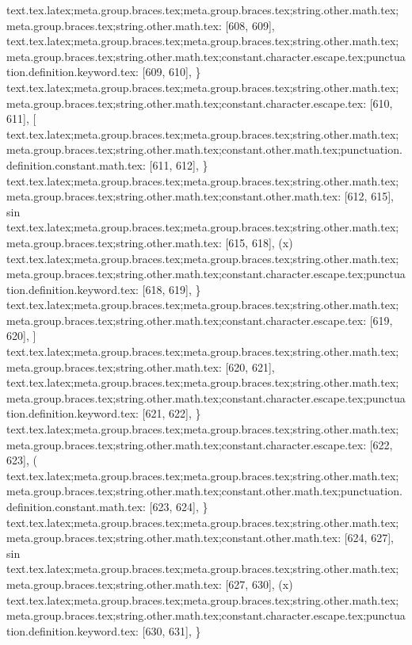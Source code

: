{{{{{{{{{{{{{{{text.tex.latex;meta.group.braces.tex;meta.group.braces.tex;string.other.math.tex;meta.group.braces.tex;string.other.math.tex: [608, 609], {
}
text.tex.latex;meta.group.braces.tex;meta.group.braces.tex;string.other.math.tex;meta.group.braces.tex;string.other.math.tex;constant.character.escape.tex;punctuation.definition.keyword.tex: [609, 610], {\}
text.tex.latex;meta.group.braces.tex;meta.group.braces.tex;string.other.math.tex;meta.group.braces.tex;string.other.math.tex;constant.character.escape.tex: [610, 611], {[}
text.tex.latex;meta.group.braces.tex;meta.group.braces.tex;string.other.math.tex;meta.group.braces.tex;string.other.math.tex;constant.other.math.tex;punctuation.definition.constant.math.tex: [611, 612], {\}
text.tex.latex;meta.group.braces.tex;meta.group.braces.tex;string.other.math.tex;meta.group.braces.tex;string.other.math.tex;constant.other.math.tex: [612, 615], {sin}
text.tex.latex;meta.group.braces.tex;meta.group.braces.tex;string.other.math.tex;meta.group.braces.tex;string.other.math.tex: [615, 618], {(x)}
text.tex.latex;meta.group.braces.tex;meta.group.braces.tex;string.other.math.tex;meta.group.braces.tex;string.other.math.tex;constant.character.escape.tex;punctuation.definition.keyword.tex: [618, 619], {\}
text.tex.latex;meta.group.braces.tex;meta.group.braces.tex;string.other.math.tex;meta.group.braces.tex;string.other.math.tex;constant.character.escape.tex: [619, 620], {]}
text.tex.latex;meta.group.braces.tex;meta.group.braces.tex;string.other.math.tex;meta.group.braces.tex;string.other.math.tex: [620, 621], {
}
text.tex.latex;meta.group.braces.tex;meta.group.braces.tex;string.other.math.tex;meta.group.braces.tex;string.other.math.tex;constant.character.escape.tex;punctuation.definition.keyword.tex: [621, 622], {\}
text.tex.latex;meta.group.braces.tex;meta.group.braces.tex;string.other.math.tex;meta.group.braces.tex;string.other.math.tex;constant.character.escape.tex: [622, 623], {(}
text.tex.latex;meta.group.braces.tex;meta.group.braces.tex;string.other.math.tex;meta.group.braces.tex;string.other.math.tex;constant.other.math.tex;punctuation.definition.constant.math.tex: [623, 624], {\}
text.tex.latex;meta.group.braces.tex;meta.group.braces.tex;string.other.math.tex;meta.group.braces.tex;string.other.math.tex;constant.other.math.tex: [624, 627], {sin}
text.tex.latex;meta.group.braces.tex;meta.group.braces.tex;string.other.math.tex;meta.group.braces.tex;string.other.math.tex: [627, 630], {(x)}
text.tex.latex;meta.group.braces.tex;meta.group.braces.tex;string.other.math.tex;meta.group.braces.tex;string.other.math.tex;constant.character.escape.tex;punctuation.definition.keyword.tex: [630, 631], {\}
}}}}}}}}}}}}}}}}}}}}}
